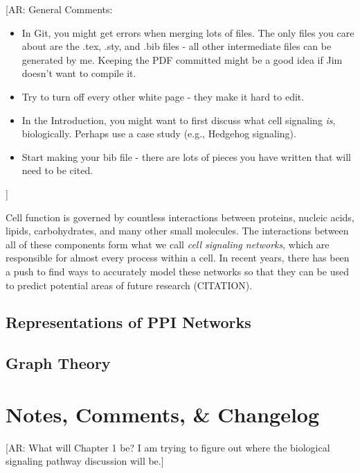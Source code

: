 \documentclass[12pt,twoside]{reedthesis}
\newcommand{\anna}[1]{{\color{blue}[AR: #1]}}
\begin{document}

\anna{General Comments:
\begin{itemize}
\item In Git, you might get errors when merging lots of files.  The only files you care about are the .tex, .sty, and .bib files - all other intermediate files can be generated by me.  Keeping the PDF committed might be a good idea if Jim doesn't want to compile it.
\item Try to turn off every other white page - they make it hard to edit.
\item In the Introduction, you might want to first discuss what cell signaling \textit{is}, biologically.  Perhaps use a case study (e.g., Hedgehog signaling).  
\item Start making your bib file - there are lots of pieces you have written that will need to be cited.   
\end{itemize}}
	
	Cell function is governed by countless interactions between proteins, nucleic acids, lipids, carbohydrates, and many other small molecules.  The interactions between all of these components form what we call \textit{cell signaling networks}, which are responsible for almost every process within a cell.  In recent years, there has been a push to find ways to accurately model these networks so that they can be used to predict potential areas of future research (CITATION).


\section{Representations of PPI Networks}


\section{Graph Theory}

    \chapter{Notes, Comments, \& Changelog}
    
    \anna{What will Chapter 1 be? I am trying to figure out where the biological signaling pathway discussion will be.}
    	
\end{document}
